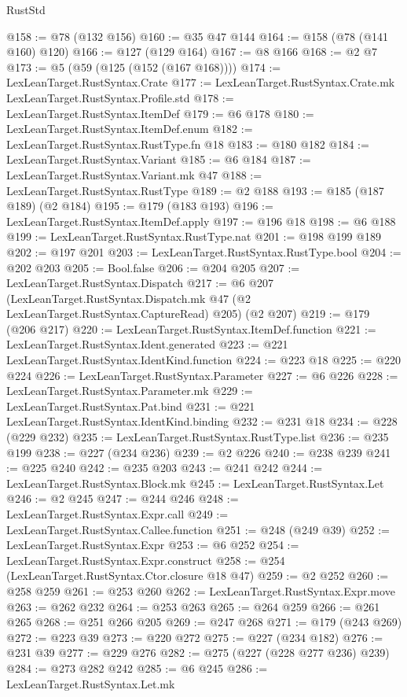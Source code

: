 \begin{lexlean}{RustStd}
\begin{coremodule}
@158 := @78 (@132 @156)
@160 := @35 @47 @144
@164 := @158 (@78 (@141 @160) @120)
@166 := @127 (@129 @164)
@167 := @8 @166
@168 := @2 @7
@173 := @5 (@59 (@125 (@152 (@167 @168))))
@174 := LexLeanTarget.RustSyntax.Crate
@177 := LexLeanTarget.RustSyntax.Crate.mk LexLeanTarget.RustSyntax.Profile.std
@178 := LexLeanTarget.RustSyntax.ItemDef
@179 := @6 @178
@180 := LexLeanTarget.RustSyntax.ItemDef.enum
@182 := LexLeanTarget.RustSyntax.RustType.fn @18
@183 := @180 @182
@184 := LexLeanTarget.RustSyntax.Variant
@185 := @6 @184
@187 := LexLeanTarget.RustSyntax.Variant.mk @47
@188 := LexLeanTarget.RustSyntax.RustType
@189 := @2 @188
@193 := @185 (@187 @189) (@2 @184)
@195 := @179 (@183 @193)
@196 := LexLeanTarget.RustSyntax.ItemDef.apply
@197 := @196 @18
@198 := @6 @188
@199 := LexLeanTarget.RustSyntax.RustType.nat
@201 := @198 @199 @189
@202 := @197 @201
@203 := LexLeanTarget.RustSyntax.RustType.bool
@204 := @202 @203
@205 := Bool.false
@206 := @204 @205
@207 := LexLeanTarget.RustSyntax.Dispatch
@217 := @6
    @207
    (LexLeanTarget.RustSyntax.Dispatch.mk @47 (@2 LexLeanTarget.RustSyntax.CaptureRead) @205)
    (@2 @207)
@219 := @179 (@206 @217)
@220 := LexLeanTarget.RustSyntax.ItemDef.function
@221 := LexLeanTarget.RustSyntax.Ident.generated
@223 := @221 LexLeanTarget.RustSyntax.IdentKind.function
@224 := @223 @18
@225 := @220 @224
@226 := LexLeanTarget.RustSyntax.Parameter
@227 := @6 @226
@228 := LexLeanTarget.RustSyntax.Parameter.mk
@229 := LexLeanTarget.RustSyntax.Pat.bind
@231 := @221 LexLeanTarget.RustSyntax.IdentKind.binding
@232 := @231 @18
@234 := @228 (@229 @232)
@235 := LexLeanTarget.RustSyntax.RustType.list
@236 := @235 @199
@238 := @227 (@234 @236)
@239 := @2 @226
@240 := @238 @239
@241 := @225 @240
@242 := @235 @203
@243 := @241 @242
@244 := LexLeanTarget.RustSyntax.Block.mk
@245 := LexLeanTarget.RustSyntax.Let
@246 := @2 @245
@247 := @244 @246
@248 := LexLeanTarget.RustSyntax.Expr.call
@249 := LexLeanTarget.RustSyntax.Callee.function
@251 := @248 (@249 @39)
@252 := LexLeanTarget.RustSyntax.Expr
@253 := @6 @252
@254 := LexLeanTarget.RustSyntax.Expr.construct
@258 := @254 (LexLeanTarget.RustSyntax.Ctor.closure @18 @47)
@259 := @2 @252
@260 := @258 @259
@261 := @253 @260
@262 := LexLeanTarget.RustSyntax.Expr.move
@263 := @262 @232
@264 := @253 @263
@265 := @264 @259
@266 := @261 @265
@268 := @251 @266 @205
@269 := @247 @268
@271 := @179 (@243 @269)
@272 := @223 @39
@273 := @220 @272
@275 := @227 (@234 @182)
@276 := @231 @39
@277 := @229 @276
@282 := @275 (@227 (@228 @277 @236) @239)
@284 := @273 @282 @242
@285 := @6 @245
@286 := LexLeanTarget.RustSyntax.Let.mk

\end{coremodule}
\end{lexlean}
